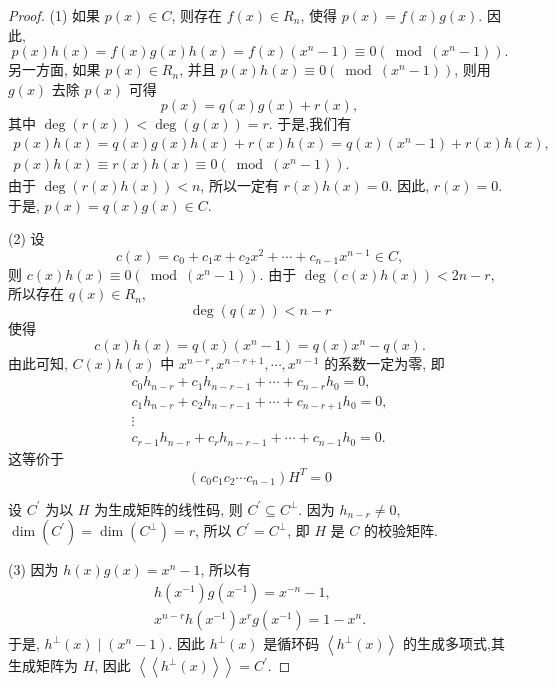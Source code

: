 \begin{proof}
 (1) 如果 $ p(x) \in C $, 则存在 $ f(x) \in R_{n} $, 使得 $ p(x)=f(x) g(x) $. 因此,
$$
p(x) h(x)=f(x) g(x) h(x)=f(x)\left(x^{n}-1\right) \equiv 0\left(\bmod \left(x^{n}-1\right)\right) .
$$
另一方面, 如果 $ p(x) \in R_{n} $, 并且 $ p(x) h(x) \equiv 0\left(\bmod \left(x^{n}-1\right)\right) $, 则用 $ g(x) $ 去除 $ p(x) $ 可得
$$
p(x)=q(x) g(x)+r(x),
$$
其中 $ \operatorname{deg}(r(x))<\operatorname{deg}(g(x))=r $.
于是,我们有
$$
\begin{array}{c}
p(x) h(x)=q(x) g(x) h(x)+r(x) h(x)=q(x)\left(x^{n}-1\right)+r(x) h(x), \\
p(x) h(x) \equiv r(x) h(x) \equiv 0\left(\bmod \left(x^{n}-1\right)\right) .
\end{array}
$$
由于 $ \operatorname{deg}(r(x) h(x))<n $, 所以一定有 $ r(x) h(x)=0 $. 因此, $ r(x)=0 $. 于是, $ p(x)=q(x) g(x) \in C $.

(2) 设
$$
c(x)=c_{0}+c_{1} x+c_{2} x^{2}+\cdots+c_{n-1} x^{n-1} \in C,
$$
则 $ c(x) h(x) \equiv 0\left(\bmod \left(x^{n}-1\right)\right) $. 由于 $ \operatorname{deg}(c(x) h(x))<2 n-r $, 所以存在 $ q(x) \in R_{n} $,
$$
\operatorname{deg}(q(x))<n-r
$$
使得
$$
c(x) h(x)=q(x)\left(x^{n}-1\right)=q(x) x^{n}-q(x) .
$$
由此可知, $ C(x) h(x) $ 中 $ x^{n-r}, x^{n-r+1}, \cdots, x^{n-1} $ 的系数一定为零, 即
$$
\begin{array}{c}
c_{0} h_{n-r}+c_{1} h_{n-r-1}+\cdots+c_{n-r} h_{0}=0, \\
c_{1} h_{n-r}+c_{2} h_{n-r-1}+\cdots+c_{n-r+1} h_{0}=0, \\
\vdots \\
c_{r-1} h_{n-r}+c_{r} h_{n-r-1}+\cdots+c_{n-1} h_{0}=0 .
\end{array}
$$
这等价于
$$
\left(c_{0} c_{1} c_{2} \cdots c_{n-1}\right) H^{T}=0
$$

设 $ C^{\prime} $ 为以 $ H $ 为生成矩阵的线性码, 则 $ C^{\prime} \subseteq C^{\perp} $. 因为 $ h_{n-r} \neq 0 $, $ \operatorname{dim}\left(C^{\prime}\right)=\operatorname{dim}\left(C^{\perp}\right)=r $, 所以 $ C^{\prime}=C^{\perp} $, 即 $ H $ 是 $ C $ 的校验矩阵.

(3) 因为 $ h(x) g(x)=x^{n}-1 $, 所以有
$$
\begin{array}{c}
h\left(x^{-1}\right) g\left(x^{-1}\right)=x^{-n}-1, \\
x^{n-r} h\left(x^{-1}\right) x^{r} g\left(x^{-1}\right)=1-x^{n} .
\end{array}
$$
于是, $ h^{\perp}(x) \mid\left(x^{n}-1\right) $. 因此 $ h^{\perp}(x) $ 是循环码 $ \left\langle h^{\perp}(x)\right\rangle $ 的生成多项式,其生成矩阵为 $ H $, 因此 $ \left\langle\left\langle h^{\perp}(x)\right\rangle\right\rangle=C^{\prime} $.

\end{proof}

